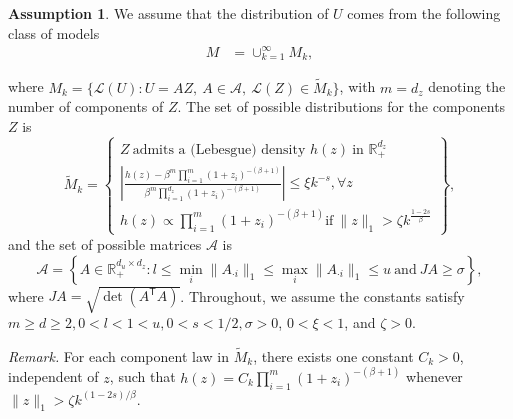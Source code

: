 \documentclass[12pt]{article}
\theoremstyle{plain}
\theoremstyle{definition}
\newtheorem{assumption}[theorem]{Assumption}
\begin{document}
\begin{assumption}
  \label{assump:mvary} We assume that the distribution of $U$ comes from the
  following class of models
  \begin{align*}
    M & = \cup_{k = 1}^{\infty} M_k,
  \end{align*} 

where $M_k=\{\mathcal L(U):U=AZ,\ A\in\mathcal A,\ \mathcal L(Z)\in\tilde M_k\}$, with $m=d_z$ denoting the number of components of $Z$. The set of possible
  distributions for the components $Z$ is
  \[ \tilde{M}_k = \left\{ \begin{array}{c}
       Z \ \text{admits a (Lebesgue) density } h (z)  \  \text{in } \mathbb{R}_+^{d_z} \\
       \left| \frac{h (z) - \beta^m  \prod_{i = 1}^m (1 +
       z_i)^{- (\beta + 1)}}{\beta^m  \prod_{i = 1}^{d_z} (1 + z_i)^{- (\beta +
       1)}} \right| \leqslant \xi k^{- s}, \forall z\\
       h (z) \varpropto \prod_{i = 1}^m (1 + z_i)^{- (\beta + 1)}  \text{if} \ \|z\|_1 > \zeta k^{\frac{1 - 2 s}{\beta}}
     \end{array} \right\}, \]
  and the set of possible matrices $\mathcal{A}$ is
  \[ \mathcal{A}= \left\{ A \in \mathbb{R}_+^{d_u \times d_z} : l \leq \min_i
     \|A_{\cdot i} \|_1 \leq \max_i \|A_{\cdot i} \|_1 \leq u \ \text{and} \  JA
     \geq \sigma \right\} ,\]
  where ${J}A = \sqrt{\det(A^\mathsf{T}A)}$. Throughout, we assume the constants satisfy $m \geq d \geq 2, 0 < l < 1 < u,
  0 < s < 1 / 2, \sigma > 0$, $0 < \xi < 1$, and $\zeta > 0$.
\end{assumption}

\noindent\textit{Remark.} For each component law in $\tilde M_k$, there exists one constant $C_k>0$, independent of $z$, such that $h(z)=C_k\prod_{i=1}^{m}(1+z_i)^{-(\beta+1)}$ whenever $\|z\|_1>\zeta k^{(1-2s)/\beta}$.
\end{document}
